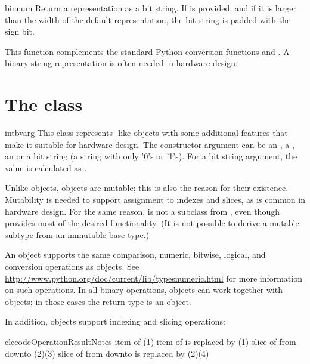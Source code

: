 \begin{funcdesc}{bin}{num }
Return a representation as a bit string.  If  is provided,
and if it is larger than the width of the default representation, the
bit string is padded with the sign bit.

This function complements the standard Python conversion functions
 and . A binary string representation is often
needed in hardware design.
\end{funcdesc}


\section{The  class}

\begin{classdesc}{intbv}{arg}
This class represents -like objects with some additional
features that make it suitable for hardware design. The constructor
argument can be an , a , an  or a
bit string (a string with only '0's or '1's). For a bit string
argument, the value is calculated as . 
\end{classdesc}

Unlike  objects,  objects are mutable; this is
also the reason for their existence. Mutability is needed to support
assignment to indexes and slices, as is common in hardware design. For
the same reason,  is not a subclass from ,
even though  provides most of the desired
functionality. (It is not possible to derive a mutable subtype from
an immutable base type.)

An  object supports the same comparison, numeric,
bitwise, logical, and conversion operations as  objects. See
\url{http://www.python.org/doc/current/lib/typesnumeric.html} for more
information on such operations. In all binary operations,
 objects can work together with  objects; in
those cases the return type is an  object.

In addition,  objects support indexing and slicing
operations:

\begin{tableiii}{clc}{code}{Operation}{Result}{Notes}
	  {item  of }
	  {(1)}
	  {item  of  is replaced by } 
          {(1)}
          {slice of  from  downto } 
          {(2)(3)}
  	  {slice of  from  downto  is replaced
          by } 
          {(2)(4)}
\end{tableiii}

